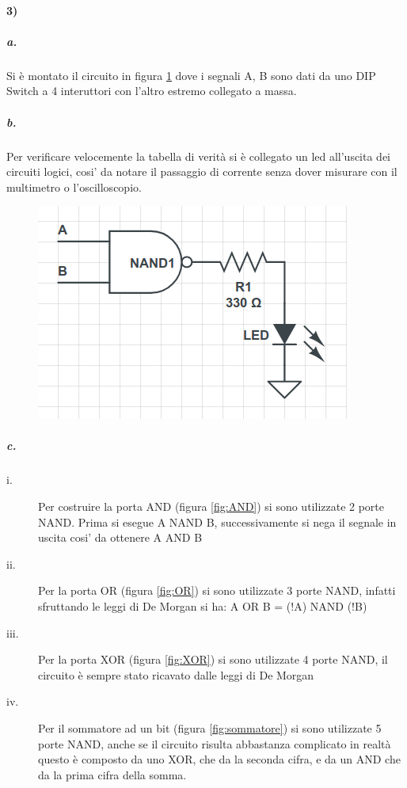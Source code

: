 \documentclass{article}
\begin{document}
\paragraph{3)}
	\subparagraph{a.}
	Si è montato il circuito in figura \ref{fig:NAND} dove i segnali A, B sono dati da uno DIP Switch a 4 interuttori con l'altro estremo collegato a massa.
	\subparagraph{b.}
	Per verificare velocemente la tabella di verità si è collegato un led all'uscita dei circuiti logici, cosi' da notare il passaggio di corrente senza dover misurare con il multimetro o l'oscilloscopio.
	\begin{figure}
	\begin{center}
		\includegraphics[width=0.5\linewidth]{figure/NAND}
		\label{fig:NAND}
	\end{center}
	\end{figure}
	\subparagraph{c.}
	\begin{description}
		\item[i.] Per costruire la porta AND (figura \ref{fig:AND}) si sono utilizzate 2 porte NAND. Prima si esegue A NAND B, successivamente si nega il segnale in uscita cosi' da ottenere A AND B
		\item[ii.] Per la porta OR (figura \ref{fig:OR}) si sono utilizzate 3 porte NAND, infatti sfruttando le leggi di De Morgan si ha: A OR B = (!A) NAND (!B) 
		\item[iii.] Per la porta XOR (figura \ref{fig:XOR}) si sono utilizzate 4 porte NAND,  il circuito è sempre stato ricavato dalle leggi di De Morgan
		\item[iv.] Per il sommatore ad un bit (figura \ref{fig:sommatore}) si sono utilizzate 5 porte NAND, anche se il circuito risulta abbastanza complicato in realtà questo è composto  da uno XOR, che da la seconda cifra, e da un AND che da la prima cifra della somma.\newline
	\end{description}
\end{document}
